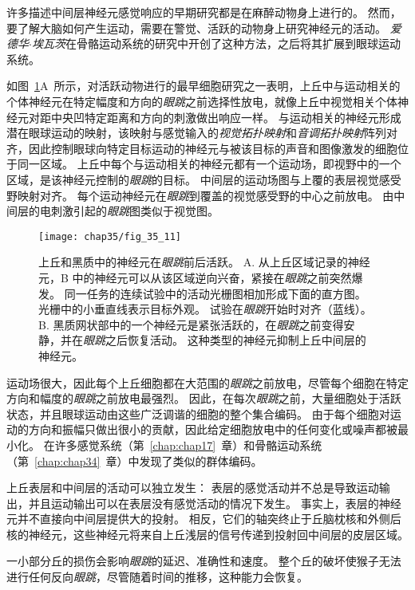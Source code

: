 许多描述中间层神经元感觉响应的早期研究都是在麻醉动物身上进行的。
然而，要了解大脑如何产生运动，需要在警觉、活跃的动物身上研究神经元的活动。
\textit{爱德华$\cdot$埃瓦茨}在骨骼运动系统的研究中开创了这种方法，之后将其扩展到眼球运动系统。


如图~\ref{fig:35_11}A~所示，对活跃动物进行的最早细胞研究之一表明，上丘中与运动相关的个体神经元在特定幅度和方向的\textit{眼跳}之前选择性放电，就像上丘中视觉相关个体神经元对距中央凹特定距离和方向的刺激做出响应一样。
与运动相关的神经元形成潜在眼球运动的映射，该映射与感觉输入的\textit{视觉拓扑映射}和\textit{音调拓扑映射}阵列对齐，因此控制眼球向特定目标运动的神经元与被该目标的声音和图像激发的细胞位于同一区域。
上丘中每个与运动相关的神经元都有一个运动场，即视野中的一个区域，是该神经元控制的\textit{眼跳}的目标。
中间层的运动场图与上覆的表层视觉感受野映射对齐。
每个运动神经元在\textit{眼跳}到覆盖的视觉感受野的中心之前放电。
由中间层的电刺激引起的\textit{眼跳}图类似于视觉图。


\begin{figure}[htbp]
	\centering
	\texttt{[image: chap35/fig\_35\_11]}
	\caption{上丘和黑质中的神经元在\textit{眼跳}前后活跃\cite{hikosaka1989functional}。
		A. 从上丘区域记录的神经元，B 中的神经元可以从该区域逆向兴奋，紧接在\textit{眼跳}之前突然爆发。
		同一任务的连续试验中的活动光栅图相加形成下面的直方图。
		光栅中的小垂直线表示目标外观。
		试验在\textit{眼跳}开始时对齐（蓝线）。
		B. 黑质网状部中的一个神经元是紧张活跃的，在\textit{眼跳}之前变得安静，并在\textit{眼跳}之后恢复活动。
		这种类型的神经元抑制上丘中间层的神经元。}
	\label{fig:35_11}
\end{figure}


运动场很大，因此每个上丘细胞都在大范围的\textit{眼跳}之前放电，尽管每个细胞在特定方向和幅度的\textit{眼跳}之前放电最强烈。
因此，在每次\textit{眼跳}之前，大量细胞处于活跃状态，并且眼球运动由这些广泛调谐的细胞的整个集合编码。
由于每个细胞对运动的方向和振幅只做出很小的贡献，因此给定细胞放电中的任何变化或噪声都被最小化。
在许多感觉系统（第~\ref{chap:chap17}~章）和骨骼运动系统（第~\ref{chap:chap34}~章）中发现了类似的群体编码。


上丘表层和中间层的活动可以独立发生：
表层的感觉活动并不总是导致运动输出，并且运动输出可以在表层没有感觉活动的情况下发生。
事实上，表层的神经元并不直接向中间层提供大的投射。
相反，它们的轴突终止于丘脑枕核和外侧后核的神经元，这些神经元将来自上丘浅层的信号传递到投射回中间层的皮层区域。


一小部分丘的损伤会影响\textit{眼跳}的延迟、准确性和速度。
整个丘的破坏使猴子无法进行任何反向\textit{眼跳}，尽管随着时间的推移，这种能力会恢复。



